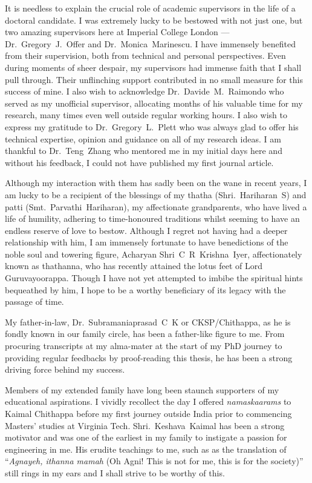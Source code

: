 It is needless to explain the crucial role of academic supervisors in the life
of a doctoral candidate. I was extremely lucky to be bestowed with not just one,
but two amazing supervisors here at Imperial College London --- \mbox{Dr.\
Gregory J.\ Offer} and \mbox{Dr.\ Monica Marinescu}. I have immensely benefited
from their supervision, both from technical and personal perspectives. Even
during moments of sheer despair, my supervisors had immense faith that I shall
pull through. Their unflinching support contributed in no small measure for this
success of mine. I also wish to acknowledge \mbox{Dr.\ Davide M.\ Raimondo} who
served as my unofficial supervisor, allocating months of his valuable time for
my research, many times even well outside regular working hours. I also wish to
express my gratitude to \mbox{Dr.\ Gregory L.\ Plett} who was always glad to offer
his technical expertise, opinion and guidance on all of my research ideas. I am
thankful to \mbox{Dr. Teng Zhang} who mentored me in my initial days here and
without his feedback, I could not have published my first journal article.

Although my interaction with them has sadly been on the wane in recent years, I
am lucky to be a recipient of the blessings of my thatha \mbox{(Shri.\ Hariharan
S)} and patti \mbox{(Smt.\ Parvathi Hariharan)}, my affectionate grandparents,
who have lived a life of humility, adhering to time-honoured traditions whilst
seeming to have an endless reserve of love to bestow. Although I regret not
having had a deeper relationship with him, I am immensely fortunate  to have 
benedictions of the noble soul and towering figure, Acharyan \mbox{Shri C R
Krishna Iyer}, affectionately known as thathanna, who has recently attained the
lotus feet of Lord Guruvayoorappa. Though I have not yet attempted to imbibe the
spiritual hints bequeathed by him, I hope to be a worthy beneficiary of its
legacy with the passage of time.

My father-in-law, \mbox{Dr.\ Subramaniaprasad C K} or CKSP/Chithappa, as he is
fondly known in our family circle, has been a father-like figure to me. From
procuring transcripts at my alma-mater at the start of my PhD journey to
providing regular feedbacks by proof-reading this thesis, he has been a strong
driving force behind my success.

Members of my extended family have long been staunch supporters of my
educational aspirations. I vividly recollect the day I offered
\emph{namaskaarams} to Kaimal Chithappa before my first journey outside India
prior to commencing Masters' studies at Virginia Tech. \mbox{Shri.\ Keshava
Kaimal} has been a strong motivator and was one of the earliest in my family to
instigate a passion for engineering in me. His erudite teachings to me, such as
as the translation of  ``\emph{Agnayeh, ithanna mamah} (Oh Agni! This is not for
me, this is for the society)'' still rings in my ears and I shall strive to be
worthy of this. 

